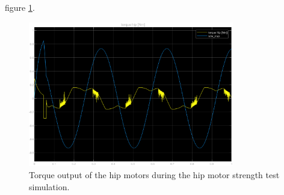figure \ref{fig:hip_motor_torque_test}.

\begin{figure}[H]
    \centering
    \includegraphics[width=0.8\textwidth]{Images/hip_motor_torque.eps}
    \caption{Torque output of the hip motors during the hip motor strength test simulation.}
    \label{fig:hip_motor_torque_test}
\end{figure}